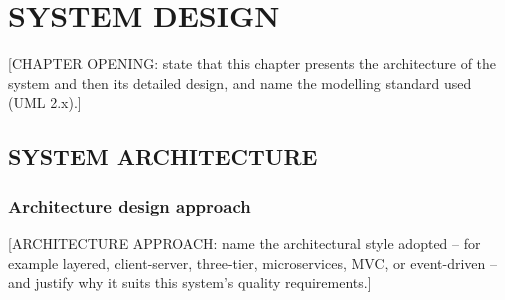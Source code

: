 %
%
\chapter{SYSTEM DESIGN}
\label{ch:system-design}

[CHAPTER OPENING: state that this chapter presents the architecture of
the system and then its detailed design, and name the modelling
standard used (UML 2.x).]

\section{SYSTEM ARCHITECTURE}
\label{sec:system-architecture}

\subsection{Architecture design approach}
\label{subsec:arch-approach}

[ARCHITECTURE APPROACH: name the architectural style adopted -- for
example layered, client-server, three-tier, microservices, MVC, or
event-driven -- and justify why it suits this system's quality
requirements.]

